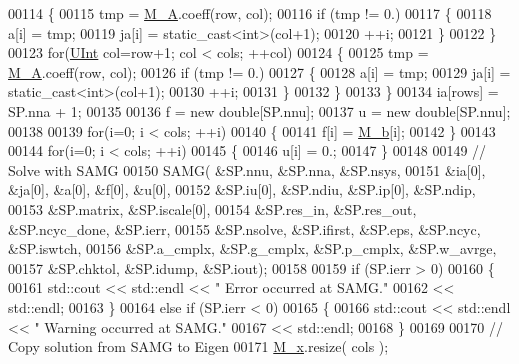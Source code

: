 \begin{DoxyCode}
00114         \{
00115             tmp = \hyperlink{classFVCode3D_1_1Solver_a7a7d556033c96bef473a2dc694af9036}{M\_A}.coeff(row, col);
00116             \textcolor{keywordflow}{if} (tmp != 0.)
00117             \{
00118                 a[i] = tmp;
00119                 ja[i] = \textcolor{keyword}{static\_cast<}\textcolor{keywordtype}{int}\textcolor{keyword}{>}(col+1);
00120                 ++i;
00121             \}
00122         \}
00123         \textcolor{keywordflow}{for}(\hyperlink{namespaceFVCode3D_a4bf7e328c75d0fd504050d040ebe9eda}{UInt} col=row+1; col < cols; ++col)
00124         \{
00125             tmp = \hyperlink{classFVCode3D_1_1Solver_a7a7d556033c96bef473a2dc694af9036}{M\_A}.coeff(row, col);
00126             \textcolor{keywordflow}{if} (tmp != 0.)
00127             \{
00128                 a[i] = tmp;
00129                 ja[i] = \textcolor{keyword}{static\_cast<}\textcolor{keywordtype}{int}\textcolor{keyword}{>}(col+1);
00130                 ++i;
00131             \}
00132         \}
00133     \}
00134     ia[rows] = SP.nna + 1;
00135 
00136     f = \textcolor{keyword}{new} \textcolor{keywordtype}{double}[SP.nnu];
00137     u = \textcolor{keyword}{new} \textcolor{keywordtype}{double}[SP.nnu];
00138 
00139     \textcolor{keywordflow}{for}(i=0; i < cols; ++i)
00140     \{
00141         f[i] = \hyperlink{classFVCode3D_1_1Solver_ac1203c2ea481f5ebd0ce061c1e8073d3}{M\_b}[i];
00142     \}
00143 
00144     \textcolor{keywordflow}{for}(i=0; i < cols; ++i)
00145     \{
00146         u[i] = 0.;
00147     \}
00148 
00149     \textcolor{comment}{// Solve with SAMG}
00150     SAMG( &SP.nnu, &SP.nna, &SP.nsys,
00151           &ia[0], &ja[0], &a[0], &f[0], &u[0],
00152           &SP.iu[0], &SP.ndiu, &SP.ip[0], &SP.ndip,
00153           &SP.matrix, &SP.iscale[0],
00154           &SP.res\_in, &SP.res\_out, &SP.ncyc\_done, &SP.ierr,
00155           &SP.nsolve, &SP.ifirst, &SP.eps, &SP.ncyc, &SP.iswtch,
00156           &SP.a\_cmplx, &SP.g\_cmplx, &SP.p\_cmplx, &SP.w\_avrge,
00157           &SP.chktol, &SP.idump, &SP.iout);
00158 
00159     \textcolor{keywordflow}{if} (SP.ierr > 0)
00160     \{
00161         std::cout << std::endl << \textcolor{stringliteral}{" Error occurred at SAMG."}
00162                   << std::endl;
00163     \}
00164     \textcolor{keywordflow}{else} \textcolor{keywordflow}{if} (SP.ierr < 0)
00165     \{
00166         std::cout << std::endl << \textcolor{stringliteral}{" Warning occurred at SAMG."}
00167                   << std::endl;
00168     \}
00169 
00170     \textcolor{comment}{// Copy solution from SAMG to Eigen}
00171     \hyperlink{classFVCode3D_1_1Solver_a6414eabf461e95a8fc5b8a49bb06e8cb}{M\_x}.resize( cols );

\end{DoxyCode}
